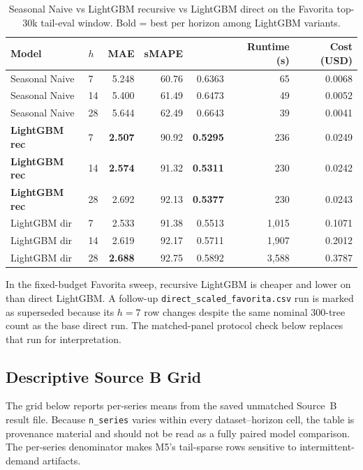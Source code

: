 \begin{table}[htbp]
\centering
\caption{Seasonal Naive vs LightGBM recursive vs LightGBM direct on the
Favorita top-30k tail-eval window.  Bold = best per horizon among LightGBM
variants.}
\label{tab:t55}
\small
\begin{tabular}{llrrrrr}
\toprule
Model & $h$ & MAE & sMAPE & \WAPE{} & Runtime (s) & Cost (USD) \\
\midrule
Seasonal Naive &  7 & 5.248 & 60.76 & 0.6363 &     65 & 0.0068 \\
Seasonal Naive & 14 & 5.400 & 61.49 & 0.6473 &     49 & 0.0052 \\
Seasonal Naive & 28 & 5.644 & 62.49 & 0.6643 &     39 & 0.0041 \\
\textbf{LightGBM rec} &  7 & \textbf{2.507} & 90.92 & \textbf{0.5295} &   236 & 0.0249 \\
\textbf{LightGBM rec} & 14 & \textbf{2.574} & 91.32 & \textbf{0.5311} &   230 & 0.0242 \\
\textbf{LightGBM rec} & 28 & 2.692 & 92.13 & \textbf{0.5377} &   230 & 0.0243 \\
LightGBM dir &  7 & 2.533 & 91.38 & 0.5513 & 1{,}015 & 0.1071 \\
LightGBM dir & 14 & 2.619 & 92.17 & 0.5711 & 1{,}907 & 0.2012 \\
LightGBM dir & 28 & \textbf{2.688} & 92.75 & 0.5892 & 3{,}588 & 0.3787 \\
\bottomrule
\end{tabular}
\end{table}

In the fixed-budget Favorita sweep, recursive LightGBM is cheaper and lower
on \WAPE{} than direct LightGBM.  A follow-up
\texttt{direct\_scaled\_favorita.csv} run is marked as superseded because its
$h=7$ row changes \WAPE{} despite the same nominal 300-tree count as the base
direct run.  The matched-panel protocol check below replaces that run for
interpretation.

\subsection{Descriptive Source B Grid}\label{app:sourceb-grid}

The grid below reports per-series \WAPE{} means from the saved unmatched
Source~B result file.  Because \texttt{n\_series} varies within every
dataset--horizon cell, the table is provenance material and should not be read
as a fully paired model comparison.  The per-series denominator makes M5's
tail-sparse rows sensitive to intermittent-demand artifacts.

